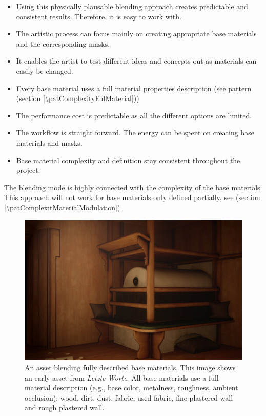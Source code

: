 \begin{description}
\begin{description}
\begin{itemize}
				\item Using this physically plausable blending approach creates predictable and consistent results. Therefore, it is easy to work with. 
				\item The artistic process can focus mainly on creating appropriate base materials and the corresponding masks.
				\item It enables the artist to test different ideas and concepts out as materials can easily be changed.  
			\end{itemize}
			\item[\performance:]\hfill
			\begin{itemize}\mynobreakpar
				\item Every base material uses a full material properties description (see pattern \emph{\patComplexityFulMaterial} (section \ref{\patComplexityFulMaterial})) 
				\item The performance cost is predictable as all the different options are limited. 
			\end{itemize}
			\item[\pipeline:]\hfill
			\begin{itemize}\mynobreakpar
				\item The workflow is straight forward. The energy can be spent on creating base materials and masks. 
				\item Base material complexity and definition stay consistent throughout the project. 
			\end{itemize}
		\end{description}
	\item[\patRelations:]%
	The blending mode is highly connected with the complexity of the base materials. This approach will not work for base materials only defined partially, see  \emph{\patComplexitMaterialModulation} (section \ref{\patComplexitMaterialModulation}).
\end{description}



\begin{figure}
	\centering
	\includegraphics[width=0.7\linewidth]{images/07cha_21_MAP_par.jpg}
	\caption{An asset blending fully described base materials. 
		This image shows an early asset from \emph{Letzte Worte}. All base materials use a full material description (e.g., base color, metalness, roughness, ambient occlusion): wood, dirt, dust, fabric, used fabric, fine plastered wall and rough plastered wall. }
	\label{fig:mapparFullMaterial}
\end{figure}


